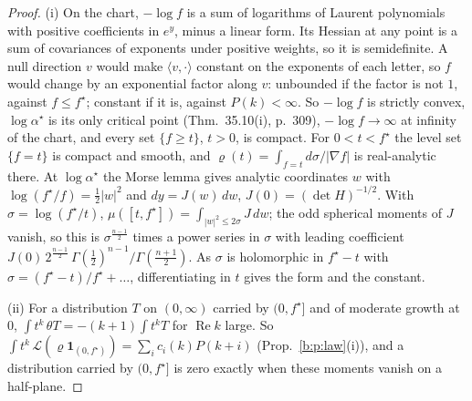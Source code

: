\documentclass[11pt]{article}
\newcommand{\one}{\mathbf 1}
\theoremstyle{plain}
\theoremstyle{definition}
\theoremstyle{remark}
\begin{document}
\begin{proof}
(i) On the chart, $-\log f$ is a sum of logarithms of Laurent polynomials with positive coefficients in $e^y$, minus a linear form. Its Hessian at any point is a sum of covariances of exponents under positive weights, so it is semidefinite. A null direction $v$ would make $\langle v,\cdot\rangle$ constant on the exponents of each letter, so $f$ would change by an exponential factor along $v$: unbounded if the factor is not $1$, against $f\le f^\star$; constant if it is, against $P(k)<\infty$. So $-\log f$ is strictly convex, $\log\alpha^\star$ is its only critical point (Thm.~35.10(i), p.~309), $-\log f\to\infty$ at infinity of the chart, and every set $\{f\ge t\}$, $t>0$, is compact. For $0<t<f^\star$ the level set $\{f=t\}$ is compact and smooth, and $\varrho(t)=\int_{f=t}d\sigma/|\nabla f|$ is real-analytic there. At $\log\alpha^\star$ the Morse lemma gives analytic coordinates $w$ with $\log(f^\star/f)=\frac12|w|^2$ and $dy=J(w)\,dw$, $J(0)=(\det H)^{-1/2}$. With $\sigma=\log(f^\star/t)$, $\mu([t,f^\star])=\int_{|w|^2\le2\sigma}J\,dw$; the odd spherical moments of $J$ vanish, so this is $\sigma^{\frac{n-1}2}$ times a power series in $\sigma$ with leading coefficient $J(0)\,2^{\frac{n-1}2}\,\Gamma(\frac12)^{n-1}/\Gamma(\frac{n+1}2)$. As $\sigma$ is holomorphic in $f^\star-t$ with $\sigma=(f^\star-t)/f^\star+\dots$, differentiating in $t$ gives the form and the constant.

(ii) For a distribution $T$ on $(0,\infty)$ carried by $(0,f^\star]$ and of moderate growth at $0$, $\int t^k\,\theta T=-(k+1)\int t^kT$ for $\operatorname{Re}k$ large. So $\int t^k\,\mathcal L(\varrho\one_{(0,f^\star)})=\sum_ic_i(k)P(k+i)$ (Prop.~\ref{b:p:law}(i)), and a distribution carried by $(0,f^\star]$ is zero exactly when these moments vanish on a half-plane.


\end{proof}
\end{document}
